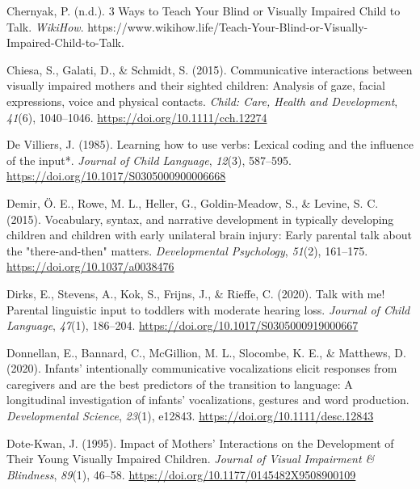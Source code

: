 \documentclass[
  man,floatsintext]{apa6}
\newlength{\cslhangindent}
\newlength{\cslentryspacingunit} %
\newenvironment{CSLReferences}[2] %
 {%
  \setlength{\parindent}{0pt}
  \ifodd #1
  \let\oldpar\par
  \def\par{\hangindent=\cslhangindent\oldpar}
  \fi
  \setlength{\parskip}{#2\cslentryspacingunit}
 }%
 {}
\begin{document}
\begin{CSLReferences}{1}{0}
\leavevmode{}%
Chernyak, P. (n.d.). 3 {Ways} to {Teach Your Blind} or {Visually Impaired Child} to {Talk}. \emph{WikiHow}. https://www.wikihow.life/Teach-Your-Blind-or-Visually-Impaired-Child-to-Talk.

\leavevmode{}%
Chiesa, S., Galati, D., \& Schmidt, S. (2015). Communicative interactions between visually impaired mothers and their sighted children: Analysis of gaze, facial expressions, voice and physical contacts. \emph{Child: Care, Health and Development}, \emph{41}(6), 1040--1046. \url{https://doi.org/10.1111/cch.12274}

\leavevmode{}%
De Villiers, J. (1985). Learning how to use verbs: Lexical coding and the influence of the input*. \emph{Journal of Child Language}, \emph{12}(3), 587--595. \url{https://doi.org/10.1017/S0305000900006668}

\leavevmode{}%
Demir, Ö. E., Rowe, M. L., Heller, G., Goldin-Meadow, S., \& Levine, S. C. (2015). Vocabulary, syntax, and narrative development in typically developing children and children with early unilateral brain injury: Early parental talk about the "there-and-then" matters. \emph{Developmental Psychology}, \emph{51}(2), 161--175. \url{https://doi.org/10.1037/a0038476}

\leavevmode{}%
Dirks, E., Stevens, A., Kok, S., Frijns, J., \& Rieffe, C. (2020). Talk with me! {Parental} linguistic input to toddlers with moderate hearing loss. \emph{Journal of Child Language}, \emph{47}(1), 186--204. \url{https://doi.org/10.1017/S0305000919000667}

\leavevmode{}%
Donnellan, E., Bannard, C., McGillion, M. L., Slocombe, K. E., \& Matthews, D. (2020). Infants' intentionally communicative vocalizations elicit responses from caregivers and are the best predictors of the transition to language: {A} longitudinal investigation of infants' vocalizations, gestures and word production. \emph{Developmental Science}, \emph{23}(1), e12843. \url{https://doi.org/10.1111/desc.12843}

\leavevmode{}%
Dote-Kwan, J. (1995). Impact of {Mothers}' {Interactions} on the {Development} of {Their Young Visually Impaired Children}. \emph{Journal of Visual Impairment \& Blindness}, \emph{89}(1), 46--58. \url{https://doi.org/10.1177/0145482X9508900109}


\end{CSLReferences}
\end{document}

